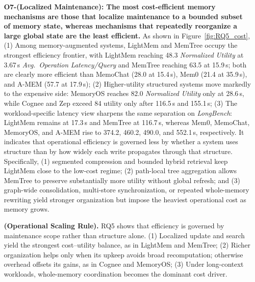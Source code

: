\noindent \textbf{O7-(Localized Maintenance): The most cost-efficient memory mechanisms are those that localize maintenance to a bounded subset of memory state, whereas mechanisms that repeatedly reorganize a large global state are the least efficient.}
As shown in Figure~\ref{fig:RQ5_cost}, (1) Among memory-augmented systems, LightMem and MemTree occupy the strongest efficiency frontier, with LightMem reaching 48.3 \textit{Normalized Utility} at 3.67\,s \textit{Avg.\ Operation Latency/Query} and MemTree reaching 63.5 at 15.9\,s; both are clearly more efficient than MemoChat (28.0 at 15.4\,s), Mem0 (21.4 at 35.9\,s), and A-MEM (57.7 at 17.9\,s);
(2) Higher-utility structured systems move markedly to the expensive side: MemoryOS reaches 82.0 \textit{Normalized Utility} only at 28.6\,s, while Cognee and Zep exceed 84 utility only after 116.5\,s and 155.1\,s;
(3) The workload-specific latency view sharpens the same separation on \textit{LongBench}: LightMem remains at 17.3\,s and MemTree at 116.7\,s, whereas Mem0, MemoChat, MemoryOS, and A-MEM rise to 374.2, 460.2, 490.0, and 552.1\,s, respectively.
It indicates that operational efficiency is governed less by whether a system uses structure than by how widely each write propagates through that structure.
Specifically, (1) segmented compression and bounded hybrid retrieval keep LightMem close to the low-cost regime;
(2) path-local tree aggregation allows MemTree to preserve substantially more utility without global refresh;
and (3) graph-wide consolidation, multi-store synchronization, or repeated whole-memory rewriting yield stronger organization but impose the heaviest operational cost as memory grows.

\begin{findingbox}
\textbf{(Operational Scaling Rule).}
RQ5 shows that efficiency is governed by maintenance scope rather than structure alone.
(1) Localized update and search yield the strongest cost--utility balance, as in LightMem and MemTree;
(2) Richer organization helps only when its upkeep avoids broad recomputation; otherwise overhead offsets its gains, as in Cognee and MemoryOS;
(3) Under long-context workloads, whole-memory coordination becomes the dominant cost driver.
\end{findingbox}
